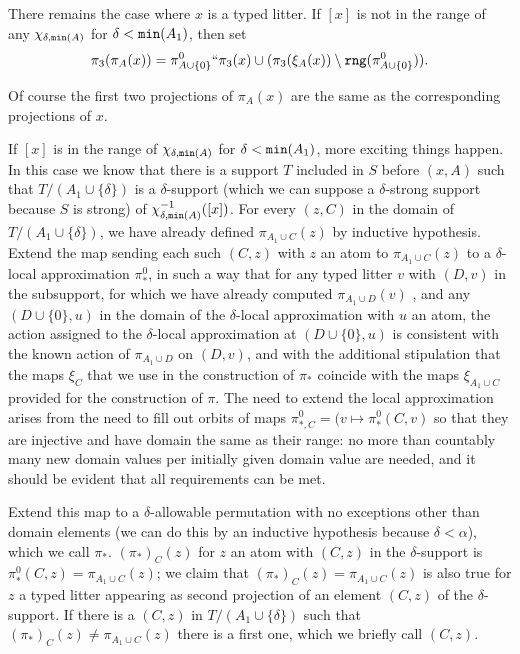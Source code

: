 \documentclass[12pt]{article}
\begin{document}
\begin{description}
There remains the case where $x$ is a typed litter.  If $[x]$ is not in the range of any $\chi_{\delta,{\tt min}(A)}$ for $\delta<{\tt min}(A_1)$, then  set $$\pi_3(\pi_A(x)) = \pi^0_{A\cup\{0\}}``\pi_3(x) \cup (\pi_3(\xi_A(x)) \setminus {\tt rng}(\pi^0_{A\cup\{0\}})).$$

Of course the first two projections of $\pi_A(x)$ are the same as the corresponding projections of $x$.

If $[x]$ is in the range of $\chi_{\delta,{\tt min}(A)}$ for $\delta<{\tt min}(A_1)$, more exciting things happen.  In this case we know that there is a support $T$ included in $S$ before $(x,A)$
such that $T/(A_1 \cup \{\delta\})$ is a $\delta$-support (which we can suppose a $\delta$-strong support because $S$ is strong) of $\chi_{\delta,{\tt min}(A)}^{-1}([x])$.  For every $(z,C)$ in the domain of
$T/(A_1 \cup \{\delta\})$, we have already defined $\pi_{A_1 \cup C}(z)$ by inductive hypothesis.  Extend the map sending each such $(C,z)$ with $z$ an atom to $\pi_{A_1 \cup C}(z)$ to a $\delta$-local approximation $\pi^0_*$, in such a way that
for any typed litter $v$ with $(D,v)$ in the subsupport, for which we have already computed $\pi_{A_1 \cup D}(v)$ , and any $(D\cup \{0\},u)$ in the domain of the $\delta$-local approximation with $u$ an atom, the action assigned to the $\delta$-local approximation at  $(D\cup \{0\},u)$ is consistent with the known action of $\pi_{A_1 \cup D}$ on $(D,v)$, and with the additional stipulation that the maps $\xi_C$ that we use in the construction of $\pi_*$ coincide with the maps $\xi_{A_1 \cup C}$ provided for the construction of $\pi$.  The need to extend the local approximation arises from the need to fill out orbits of maps $\pi^0_{*,C}= (v \mapsto \pi^0_*(C,v)$ so that they are injective and have domain the same as their range:  no more than countably many new domain values per initially given domain value are needed, and it should be evident that all requirements can be met.

Extend this map to a $\delta$-allowable permutation with no exceptions other than domain elements (we can do this by an inductive hypothesis because $\delta<\alpha$), which we call $\pi_*$.  $(\pi_*)_C(z)$ for $z$ an atom with $(C,z)$ in the $\delta$-support  is $\pi^0_*(C,z) = \pi_{A_1 \cup C}(z)$;
we claim that $(\pi_*)_C(z) = \pi_{A_1 \cup C}(z)$ is also true for $z$ a typed litter appearing as second projection of an element $(C,z)$ of the $\delta$-support.  If there is a  $(C,z)$ in $T/(A_1 \cup \{\delta\})$ such that $(\pi_*)_C(z) \neq \pi_{A_1 \cup C}(z)$  there is a first one, which we briefly call $(C,z)$.


\end{description}
\end{document}
